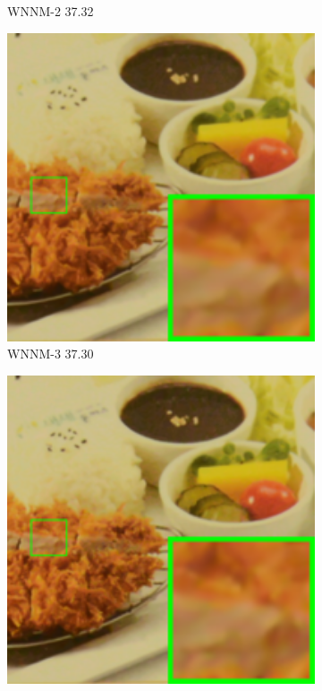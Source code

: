 \begin{figure}
\begin{subfigure}[t]{0.19\textwidth}
		\caption{WNNM-2 37.32}
    \end{subfigure}
    \hfill
    \begin{subfigure}[t]{0.19\textwidth}
        \centering
        \includegraphics[width=1\textwidth]{images/mcwnnm/cc/resize_br_WNNM_ADMM_NL_CC15_d800_iso3200_2.png}
		\caption{WNNM-3 37.30}
    \end{subfigure}
    \hfill
    \begin{subfigure}[t]{0.19\textwidth}
        \centering
        \includegraphics[width=1\textwidth]{images/mcwnnm/cc/resize_br_CWNNM_ADMM_NL_CC15_d800_iso3200_2.png}

\end{subfigure}
\end{figure}
